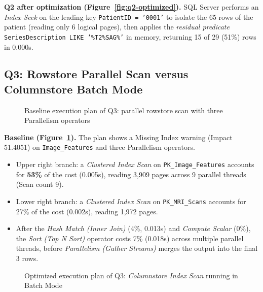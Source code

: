 \textbf{Q2 after optimization (Figure~\ref{fig:q2-optimized}).} SQL Server performs an \textit{Index Seek} on the leading key \texttt{PatientID = '0001'} to isolate the 65 rows of the patient (reading only 6 logical pages), then applies the \textit{residual predicate} \texttt{SeriesDescription LIKE '\%T2\%SAG\%'} in memory, returning 15 of 29 (51\%) rows in 0.000s.

\subsection{Q3: Rowstore Parallel Scan versus Columnstore Batch Mode}

\begin{figure}[H]
  \centering
  \caption{Baseline execution plan of Q3: parallel rowstore scan with three Parallelism operators}
  \label{fig:q3-baseline}
\end{figure}

\textbf{Baseline (Figure~\ref{fig:q3-baseline}).} The plan shows a Missing Index warning (Impact 51.4051) on \texttt{Image\_Features} and three Parallelism operators.
\begin{itemize}
  \item Upper right branch: a \textit{Clustered Index Scan} on \texttt{PK\_Image\_Features} accounts for \textbf{53\%} of the cost (0.005s), reading 3,909 pages across 9 parallel threads (Scan count 9).
  \item Lower right branch: a \textit{Clustered Index Scan} on \texttt{PK\_MRI\_Scans} accounts for 27\% of the cost (0.002s), reading 1,972 pages.
  \item After the \textit{Hash Match (Inner Join)} (4\%, 0.013s) and \textit{Compute Scalar} (0\%), the \textit{Sort (Top N Sort)} operator costs 7\% (0.018s) across multiple parallel threads, before \textit{Parallelism (Gather Streams)} merges the output into the final 3 rows.
\end{itemize}

\begin{figure}[H]
  \centering
  \caption{Optimized execution plan of Q3: \textit{Columnstore Index Scan} running in Batch Mode}
  \label{fig:q3-optimized}
\end{figure}


